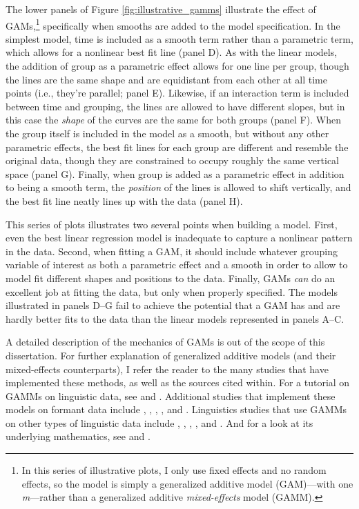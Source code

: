 The lower panels of Figure \ref{fig:illustrative_gamms} illustrate the effect of GAMs,\footnote{In this series of illustrative plots, I only use fixed effects and no random effects, so the model is simply a generalized additive model (GAM)---with one \textit{m}---rather than a generalized additive \textit{mixed-effects} model (GAMM).} specifically when smooths are added to the model specification. In the simplest model, time is included as a smooth term rather than a parametric term, which allows for a nonlinear best fit line (panel D). As with the linear models, the addition of group as a parametric effect allows for one line per group, though the lines are the same shape and are equidistant from each other at all time points (i.e., they’re parallel; panel E). Likewise, if an interaction term is included between time and grouping, the lines are allowed to have different slopes, but in this case the \textit{shape} of the curves are the same for both groups (panel F). When the group itself is included in the model as a smooth, but without any other parametric effects, the best fit lines for each group are different and resemble the original data, though they are constrained to occupy roughly the same vertical space (panel G). Finally, when group is added as a parametric effect in addition to being a smooth term, the \textit{position} of the lines is allowed to shift vertically, and the best fit line neatly lines up with the data (panel H).

This series of plots illustrates two several points when building a model. First, even the best linear regression model is inadequate to capture a nonlinear pattern in the data. Second, when fitting a GAM, it should include whatever grouping variable of interest as both a parametric effect and a smooth in order to allow to model fit different shapes and positions to the data. Finally, GAMs \textit{can} do an excellent job at fitting the data, but only when properly specified. The models illustrated in panels D--G fail to achieve the potential that a GAM has and are hardly better fits to the data than the linear models represented in panels A--C.

A detailed description of the mechanics of GAMs is out of the scope of this dissertation. For further explanation of generalized additive models (and their mixed-effects counterparts), I refer the reader to the many studies that have implemented these methods, as well as the sources cited within. For a tutorial on GAMMs on linguistic data, see \citet{soskuthy_2017} and \citet{wieling_2018}. Additional studies that implement these models on formant data include \citet{fruehwald_2017}, \citet{renwick_stanley_2020}, \citet{soskuthy_etal_2018}, \citet{warburton_2018}, and \citet{gahl_baayen_2019}. Linguistics studies that use GAMMs on other types of linguistic data include \citet{vanhofwegen_2017_diss}, \citet{kosling_etal_2013}, \citet{tomaschek_etal_2018_phonetics, tomaschek_etal_2018_vanguard}, \citet{strycharczuk_scobbie_2017}, and \citet{mielke_etal_2017}. And for a look at its underlying mathematics, see \citet{faraway_2016} and \citet{wood_2017}.

